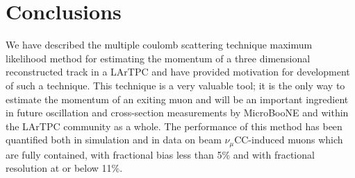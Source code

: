\documentclass[a4paper,11pt]{article}
\begin{document}
\section{Conclusions}
We have described the multiple coulomb scattering technique maximum likelihood method for estimating the momentum of a three dimensional reconstructed track in a LArTPC and have provided motivation for development of such a technique. This technique is a very valuable tool; it is the only way to estimate the momentum of an exiting muon and will be an important ingredient in future oscillation and cross-section measurements by MicroBooNE and within the LArTPC community as a whole. The performance of this method has been quantified both in simulation and in data on beam $\nu_\mu$CC-induced muons which are fully contained, with fractional bias less than 5\% and with fractional resolution at or below 11\%. 










\end{document}
